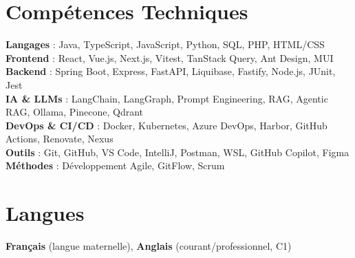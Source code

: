 \documentclass[letterpaper,11pt]{article}
\begin{document}
\section{Compétences Techniques}
    \begin{itemize}[leftmargin=0.15in, label={}]
        \small{\item{
            \textbf{Langages} : Java, TypeScript, JavaScript, Python, SQL, PHP, HTML/CSS \\
            \textbf{Frontend} : React, Vue.js, Next.js, Vitest, TanStack Query, Ant Design, MUI \\
            \textbf{Backend} : Spring Boot, Express, FastAPI, Liquibase, Fastify, Node.js, JUnit, Jest \\
            \textbf{IA \& LLMs} : LangChain, LangGraph, Prompt Engineering, RAG, Agentic RAG, Ollama, Pinecone, Qdrant \\
            \textbf{DevOps \& CI/CD} : Docker, Kubernetes, Azure DevOps, Harbor, GitHub Actions, Renovate, Nexus \\
            \textbf{Outils} : Git, GitHub, VS Code, IntelliJ, Postman, WSL, GitHub Copilot, Figma \\
            \textbf{Méthodes} : Développement Agile, GitFlow, Scrum
        }}
    \end{itemize}

\section{Langues}
    \textbf{Français} (langue maternelle), \textbf{Anglais} (courant/professionnel, C1)

\end{document}
